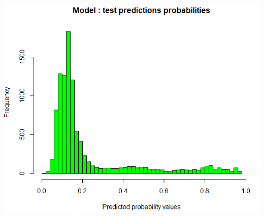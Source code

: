 \documentclass[]{article}
\begin{document}
\begin{center}
\includegraphics[scale=0.45]{preds_test}
\end{center}
\end{document}
